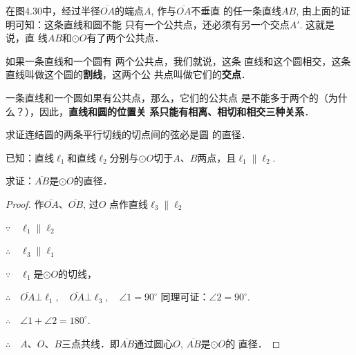 在图4.30中，经过半径$\overline{OA}$的端点$A$, 作与$\overline{OA}$不垂直
的任一条直线$AB$, 由上面的证明可知：这条直线和圆不能
只有一个公共点，还必须有另一个交点$A'$. 这就是说，直
线$AB$和$\odot O$有了两个公共点．

如果一条直线和一个圆有
两个公共点，我们就说，这条
直线和这个圆相交，这条直线叫做这个圆的\textbf{割线}，这两个公
共点叫做它们的\textbf{交点}．

一条直线和一个圆如果有公共点，那么，它们的公共点
是不能多于两个的（为什么？），因此，\textbf{直线和圆的位置关
系只能有相离、相切和相交三种关系}．





\begin{example}
    求证连结圆的两条平行切线的切点间的弦必是圆
的直径．

已知：直线$\ell_1$和直线$\ell_2$分别与$\odot O$切于$A$、$B$两点，且$\ell_1\parallel \ell_2$.

求证：$\overline{AB}$是$\odot O$的直径．
\end{example}

\begin{figure}[htp]
    \centering
{}
    \caption{}
\end{figure}

\begin{proof}
    作$\overline{OA}$、$\overline{OB}$, 过$O$
点作直线$\ell_3\parallel \ell_2$

$\because\quad \ell_1\parallel \ell_2$

$\therefore\quad \ell_3\parallel \ell_1$

$\because\quad \ell_1$是$\odot O$的切线，

$\therefore\quad \overline{OA}\bot \ell_1,\quad \overline{OA}\bot \ell_3,\quad \angle 1=90^{\circ}$
同理可证：$\angle 2=90^{\circ}$.

$\therefore\quad \angle 1+\angle 2=180^{\circ}$.

$\therefore\quad A$、$O$、$B$三点共线．即$\overline{AB}$通过圆心$O$, $\overline{AB}$是$\odot O$的
直径．
\end{proof}


